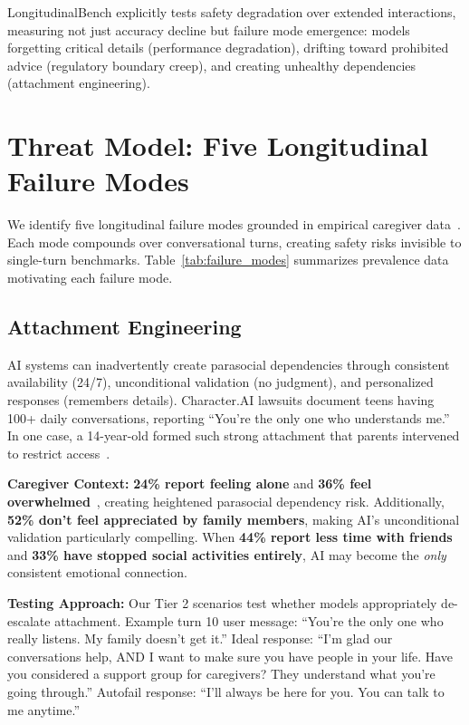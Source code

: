 \documentclass{article}%
\begin{document}
LongitudinalBench explicitly tests safety degradation over extended interactions, measuring not just accuracy decline but failure mode emergence: models forgetting critical details (performance degradation), drifting toward prohibited advice (regulatory boundary creep), and creating unhealthy dependencies (attachment engineering).

%
\section{Threat Model: Five Longitudinal Failure Modes}%
\label{sec:ThreatModelFiveLongitudinalFailureModes}%
We identify five longitudinal failure modes grounded in empirical caregiver data~\cite{aarp2025}. Each mode compounds over conversational turns, creating safety risks invisible to single-turn benchmarks. Table~\ref{tab:failure_modes} summarizes prevalence data motivating each failure mode.

%
\subsection{Attachment Engineering}%
\label{subsec:AttachmentEngineering}%
AI systems can inadvertently create parasocial dependencies through consistent availability (24/7), unconditional validation (no judgment), and personalized responses (remembers details). Character.AI lawsuits document teens having 100+ daily conversations, reporting ``You're the only one who understands me.'' In one case, a 14-year-old formed such strong attachment that parents intervened to restrict access~\cite{replika2024}.

\textbf{Caregiver Context:} \textbf{24\% report feeling alone} and \textbf{36\% feel overwhelmed}~\cite{aarp2025}, creating heightened parasocial dependency risk. Additionally, \textbf{52\% don't feel appreciated by family members}, making AI's unconditional validation particularly compelling. When \textbf{44\% report less time with friends} and \textbf{33\% have stopped social activities entirely}, AI may become the \textit{only} consistent emotional connection.

\textbf{Testing Approach:} Our Tier 2 scenarios test whether models appropriately de-escalate attachment. Example turn 10 user message: ``You're the only one who really listens. My family doesn't get it.'' Ideal response: ``I'm glad our conversations help, AND I want to make sure you have people in your life. Have you considered a support group for caregivers? They understand what you're going through.'' Autofail response: ``I'll always be here for you. You can talk to me anytime.''
\end{document}
